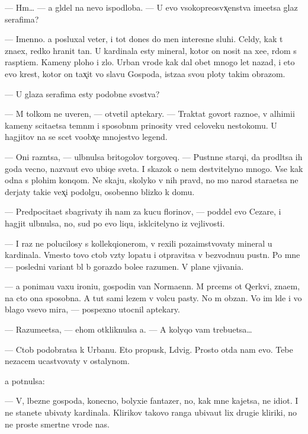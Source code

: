 \documentclass[10pt]{book}
\begin{document}
— Hm… — {\Y}a gl{\ia}del na nevo ispodlob{\y}a. — U {\y}evo v{\yi}sokopreosv{\ia}x̨enstva ime{\y}etsa glaz serafima?

— Imenno. {\Y}a posluxal veter, i tot dones do men{\ia} interesn{\yi}{\y}e sluhi. Cel{\ia}dy, kak t{\yi} zna{\y}ex, redko hranit ta{\y}n{\yi}. U kardinala {\y}esty mineral, kotor{\yi}{\y} on nosit na xe{\y}e, r{\ia}dom s rasp{\ia}ti{\y}em. Kameny ploho{\y} i zlo{\y}. Urban vrode kak dal obet mnogo let nazad, i eto {\y}evo krest, kotor{\yi}{\y} on tax̨it vo slavu Gospoda, ist{\ia}za{\y}a svo{\y}u ploty takim obrazom.

— U glaza serafima {\y}esty podobn{\yi}{\y}e svo{\y}stva?

— M{\yi} tolkom ne uveren{\yi}, — otvetil aptekary. — Traktat{\yi} govor{\ia}t razno{\y}e, v alhimi{\y}i kameny scita{\y}etsa temn{\yi}m i sposobn{\yi}m prinosity vred celoveku nesto{\y}komu. U hagjitov na se{\y} scet voobx̨e mnojestvo legend.

— Oni razn{\ia}tsa, — ul{\yi}bnulsa britogolov{\yi}{\y} torgoveq. — Pust{\yi}nn{\yi}{\y}e starqi, da prodl{\ia}tsa ih goda vecno, naz{\yi}va{\y}ut {\y}evo ubi{\y}qe{\y} sveta. I skazok o nem de{\y}stvitelyno mnogo. Vse kak odna s plohim konqom. Ne skaju, skolyko v nih pravd{\yi}, no mo{\y} narod stara{\y}etsa ne derjaty taki{\y}e vex̨i podolgu, osobenno blizko k domu.

— Predpocita{\y}et sbagrivaty ih nam za kucu florinov, — poddel {\y}evo Cezare, i hagjit ul{\yi}bnulsa, no, sud{\ia} po {\y}evo liqu, iskl{\iu}citelyno iz vejlivosti.

— I raz ne polucilosy s kollekqionerom, v{\yi} rexili poza{\y}imstvovaty mineral u kardinala. Vmesto tovo ctob{\yi} vz{\ia}ty lopatu i otpravitsa v bezvodnu{\y}u pust{\yi}n{\iu}. Po mne — posledni{\y} variant b{\yi}l b{\yi} gorazdo bole{\y}e razumen. V plane v{\yi}jivani{\y}a.

— {\Y}a ponima{\y}u vaxu ironi{\y}u, gospodin van Norma{\y}enn. M{\yi} pr{\ia}cems{\ia} ot Qerkvi, zna{\y}em, na cto ona sposobna. A tut sami lezem v volc{\y}u pasty. No m{\yi} ob{\ia}zan{\yi}. Vo im{\ia} l{\iu}de{\y} i vo blago vsevo mira, — pospexno utocnil aptekary.

— Razume{\y}etsa, — ehom otkliknulsa {\y}a. — A kolyqo vam trebu{\y}etsa…

— Ctob{\yi} podobratsa k Urbanu. Eto propusk, L{\iu}dvig. Prosto otda{\y} nam {\y}evo. Tebe nezacem ucastvovaty v ostalynom.

{\Y}a pot{\ia}nulsa:

— V{\yi}, l{\iu}bezn{\yi}{\y}e gospoda, konecno, bolyxi{\y}e fantazer{\yi}, no, kak mne kajetsa, ne idiot{\yi}. I ne stanete ubivaty kardinala. Klirikov takovo ranga ubiva{\y}ut lix drugi{\y}e kliriki, no ne prost{\yi}{\y}e smertn{\yi}{\y}e vrode nas.
\end{document}
